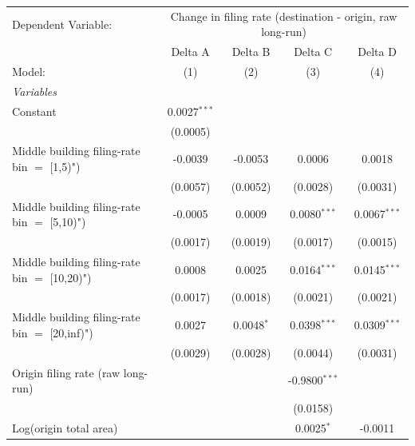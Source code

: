 \begingroup
\centering
\begin{tabular}{lcccc}
   \tabularnewline \midrule \midrule
   Dependent Variable: & \multicolumn{4}{c}{Change in filing rate (destination - origin, raw long-run)}\\
                                                  & Delta A        & Delta B      & Delta C         & Delta D \\   
   Model:                                         & (1)            & (2)          & (3)             & (4)\\  
   \midrule
   \emph{Variables}\\
   Constant                                       & 0.0027$^{***}$ &              &                 &   \\   
                                                  & (0.0005)       &              &                 &   \\   
   Middle building filing-rate bin $=$ [1,5)")    & -0.0039        & -0.0053      & 0.0006          & 0.0018\\   
                                                  & (0.0057)       & (0.0052)     & (0.0028)        & (0.0031)\\   
   Middle building filing-rate bin $=$ [5,10)")   & -0.0005        & 0.0009       & 0.0080$^{***}$  & 0.0067$^{***}$\\   
                                                  & (0.0017)       & (0.0019)     & (0.0017)        & (0.0015)\\   
   Middle building filing-rate bin $=$ [10,20)")  & 0.0008         & 0.0025       & 0.0164$^{***}$  & 0.0145$^{***}$\\   
                                                  & (0.0017)       & (0.0018)     & (0.0021)        & (0.0021)\\   
   Middle building filing-rate bin $=$ [20,inf)") & 0.0027         & 0.0048$^{*}$ & 0.0398$^{***}$  & 0.0309$^{***}$\\   
                                                  & (0.0029)       & (0.0028)     & (0.0044)        & (0.0031)\\   
   Origin filing rate (raw long-run)              &                &              & -0.9800$^{***}$ &   \\   
                                                  &                &              & (0.0158)        &   \\   
   Log(origin total area)                         &                &              & 0.0025$^{*}$    & -0.0011\\   

\end{tabular}
